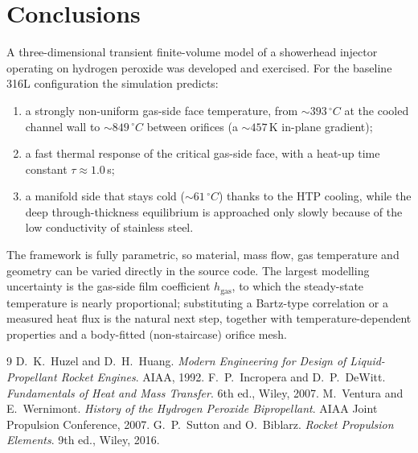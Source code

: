 \documentclass[11pt,a4paper]{article}
\newcommand{\degC}{\ensuremath{^{\circ}}C}
\begin{document}
\section{Conclusions}
A three-dimensional transient finite-volume model of a showerhead injector
operating on hydrogen peroxide was developed and exercised. For the baseline 316L
configuration the simulation predicts:
\begin{enumerate}[noitemsep]
  \item a strongly non-uniform gas-side face temperature, from $\sim\!393\,\degC$
        at the cooled channel wall to $\sim\!849\,\degC$ between orifices
        (a $\sim\!457\,$K in-plane gradient);
  \item a fast thermal response of the critical gas-side face, with a heat-up
        time constant $\tau\approx1.0\,$s;
  \item a manifold side that stays cold ($\sim\!61\,\degC$) thanks to the HTP
        cooling, while the deep through-thickness equilibrium is approached only
        slowly because of the low conductivity of stainless steel.
\end{enumerate}
The framework is fully parametric, so material, mass flow, gas temperature and
geometry can be varied directly in the source code. The largest modelling
uncertainty is the gas-side film coefficient $h_\mathrm{gas}$, to which the
steady-state temperature is nearly proportional; substituting a Bartz-type
correlation or a measured heat flux is the natural next step, together with
temperature-dependent properties and a body-fitted (non-staircase) orifice mesh.

\begin{thebibliography}{9}
 D.~K.~Huzel and D.~H.~Huang. \emph{Modern Engineering for Design
  of Liquid-Propellant Rocket Engines}. AIAA, 1992.
 F.~P.~Incropera and D.~P.~DeWitt. \emph{Fundamentals of Heat
  and Mass Transfer}. 6th ed., Wiley, 2007.
 M.~Ventura and E.~Wernimont. \emph{History of the Hydrogen
  Peroxide Bipropellant}. AIAA Joint Propulsion Conference, 2007.
 G.~P.~Sutton and O.~Biblarz. \emph{Rocket Propulsion Elements}.
  9th ed., Wiley, 2016.
\end{thebibliography}
\end{document}
